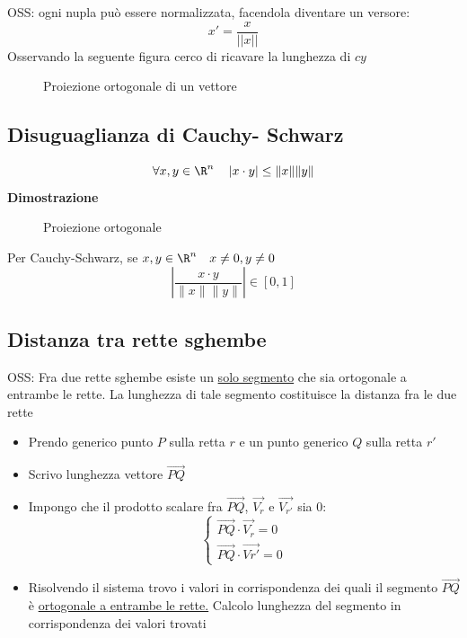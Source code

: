 \documentclass[12pt,a4paper,oneside]{article}
\begin{document}
OSS: ogni nupla può essere normalizzata, facendola diventare un versore: \[
	x' = \frac{x}{\left|\left|x\right|\right|}
\]
Osservando la seguente figura cerco di ricavare la lunghezza di $cy$
\begin{figure}[h]
	\centering
	
	\caption{Proiezione ortogonale di un vettore}
\end{figure}

\subsection{Disuguaglianza di Cauchy- Schwarz}
\[
	\forall x, y  \in  \R ^{n} \quad \left|x \cdot y \right| \le \|x\| \| y\|
\]
\textbf{Dimostrazione}
\begin{figure}[h]
	\centering
	
	\caption{Proiezione ortogonale}
\end{figure}

Per Cauchy-Schwarz, se $ x, y  \in  \R ^{ n} \quad  x \neq 0 , y \neq 0$
\[
	\left|\frac{x \cdot y}{\|x\|\| y\|}\right|  \in  \left[ 0,1 \right]
\]
\subsection{Distanza tra rette sghembe}
OSS: Fra due rette sghembe esiste un \underline{solo segmento} che sia ortogonale a entrambe le rette. La lunghezza di tale segmento costituisce la distanza fra le due rette
\begin{itemize}
	\item Prendo generico punto $P$ sulla retta $r$ e un punto generico $Q$ sulla retta $r'$
	\item Scrivo lunghezza vettore $\vec{PQ}$
	\item Impongo che il prodotto scalare fra $\vec{PQ} $, $ \vec{V_r}$ e $\vec{V_{r'}}$ sia 0: \[
		      \begin{cases}
			      \vec{PQ} \cdot \vec{V_r} =0 \\
			      \vec{PQ} \cdot \vec{V{r'}} = 0
		      \end{cases}
	      \]
	\item Risolvendo il sistema trovo i valori in corrispondenza dei quali il segmento $\vec{PQ}$ è \underline{ortogonale a entrambe le rette.} Calcolo lunghezza del segmento in corrispondenza dei valori trovati
\end{itemize}
\end{document}
